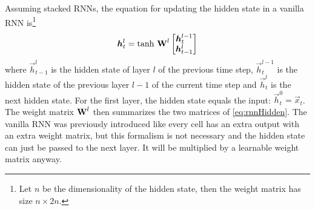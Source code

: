 		Assuming stacked RNNs, the equation for updating the hidden state in a vanilla RNN is\footnote{Let \(n\) be the dimensionality of the hidden state, then the weight matrix has size \( n \times 2n \).}
		\begin{equation}
			\bm{h}_t^l = \tanh\,
			\bm{\mathrm{W}}^l
			\begin{bmatrix}
				\bm{h}_t^{l - 1} \\
				\bm{h}_{t - 1}^l
			\end{bmatrix}
		\end{equation}
		where \( \vec{h}_{t - 1}^l \) is the hidden state of layer \(l\) of the previous time step, \( \vec{h}_t^{l - 1} \) is the hidden state of the previous layer \(l - 1\) of the current time step and \(\vec{h}_t^l\) is the next hidden state. For the first layer, the hidden state equals the input: \( \vec{h}_t^0 = \vec{x}_t \). The weight matrix \( \bm{\mathrm{W}}^l \) then summarizes the two matrices of \eqref{eq:rnnHidden}. The vanilla RNN was previously introduced like every cell has an extra output with an extra weight matrix, but this formalism is not necessary and the hidden state can just be passed to the next layer. It will be multiplied by a learnable weight matrix anyway.

